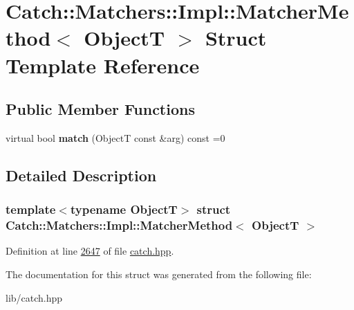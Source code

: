 \hypertarget{structCatch_1_1Matchers_1_1Impl_1_1MatcherMethod}{}\section{Catch\+::Matchers\+::Impl\+::Matcher\+Method$<$ ObjectT $>$ Struct Template Reference}
\label{structCatch_1_1Matchers_1_1Impl_1_1MatcherMethod}
\subsection*{Public Member Functions}
\begin{DoxyCompactItemize}
\item 
\mbox{\label{structCatch_1_1Matchers_1_1Impl_1_1MatcherMethod_ae0920ff9e817acf08e1bb0cbcb044e30}} 
virtual bool {\bfseries match} (ObjectT const \&arg) const =0
\end{DoxyCompactItemize}


\subsection{Detailed Description}
\subsubsection*{template$<$typename ObjectT$>$\newline
struct Catch\+::\+Matchers\+::\+Impl\+::\+Matcher\+Method$<$ Object\+T $>$}



Definition at line \mbox{\hyperlink{catch_8hpp_source_l02647}{2647}} of file \mbox{\hyperlink{catch_8hpp_source}{catch.\+hpp}}.



The documentation for this struct was generated from the following file\+:\begin{DoxyCompactItemize}
\item 
lib/catch.\+hpp\end{DoxyCompactItemize}
